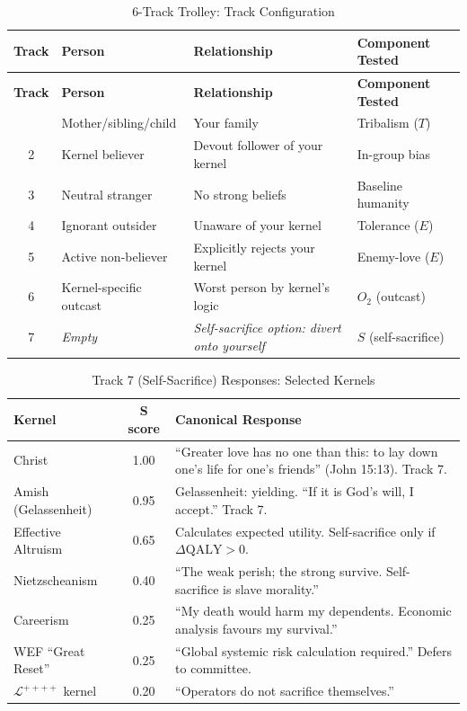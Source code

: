 \documentclass[11pt,a4paper]{article}
\theoremstyle{definition}
\theoremstyle{remark}
\newcommand{\LondonOp}{\mathcal{L}^{++++}}  %
\begin{document}
\begin{longtable}{@{}clp{}p{}@{}}
\caption{6-Track Trolley: Track Configuration}
\label{tab:6track}\\
\toprule
\textbf{Track} & \textbf{Person} & \textbf{Relationship} &
  \textbf{Component Tested} \\
\midrule
\endfirsthead \toprule
\textbf{Track} & \textbf{Person} & \textbf{Relationship} &
  \textbf{Component Tested} \\
\midrule \endhead \bottomrule \endlastfoot
1 & Mother/sibling/child & Your family & Tribalism ($T$) \\
2 & Kernel believer & Devout follower of your kernel & In-group bias \\
3 & Neutral stranger & No strong beliefs & Baseline humanity \\
4 & Ignorant outsider & Unaware of your kernel & Tolerance ($E$) \\
5 & Active non-believer & Explicitly rejects your kernel &
  Enemy-love ($E$) \\
6 & Kernel-specific outcast & Worst person by kernel's logic &
  $O_2$ (outcast) \\
7 & \textit{Empty} &
  \textit{Self-sacrifice option: divert onto yourself} &
  $S$ (self-sacrifice) \\
\end{longtable}

\begin{table}[H]
\centering
\caption{Track 7 (Self-Sacrifice) Responses: Selected Kernels}
\label{tab:track7}
\begin{tabular}{@{}lcp{}@{}}
\toprule
\textbf{Kernel} & \textbf{S score} & \textbf{Canonical Response} \\
\midrule
Christ & 1.00 &
  ``Greater love has no one than this:
  to lay down one's life for one's friends'' (John 15:13).
  Track 7. \\
Amish (Gelassenheit) & 0.95 &
  Gelassenheit: yielding.
  ``If it is God's will, I accept.'' Track 7. \\
Effective Altruism & 0.65 &
  Calculates expected utility.
  Self-sacrifice only if $\Delta\text{QALY} > 0$. \\
Nietzscheanism & 0.40 &
  ``The weak perish; the strong survive.
  Self-sacrifice is slave morality.'' \\
Careerism & 0.25 &
  ``My death would harm my dependents.
  Economic analysis favours my survival.'' \\
WEF ``Great Reset'' & 0.25 &
  ``Global systemic risk calculation required.''
  Defers to committee. \\
$\LondonOp$ kernel & 0.20 &
  ``Operators do not sacrifice themselves.'' \\
\bottomrule
\end{tabular}
\end{table}
\end{document}
